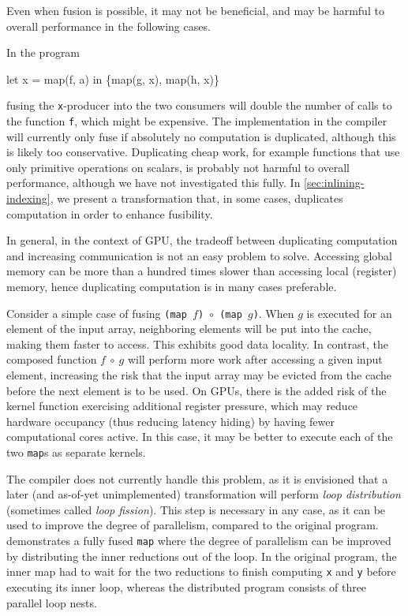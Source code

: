 Even when fusion is possible, it may not be beneficial, and may be
harmful to overall performance in the following cases.

\begin{description}[style=nextline]
\item[Computation may be duplicated.]

In the program
\begin{colorcode}
let x = map(f, a) in
\{map(g, x), map(h, x)\}
\end{colorcode}
fusing the \texttt{x}-producer into the two consumers will double the
number of calls to the function \texttt{f}, which might be expensive.
The implementation in the \LO{} compiler will currently only fuse if
absolutely no computation is duplicated, although this is likely too
conservative.  Duplicating cheap work, for example functions that use
only primitive operations on scalars, is probably not harmful to
overall performance, although we have not investigated this fully.  In
\cref{sec:inlining-indexing}, we present a transformation that, in
some cases, duplicates computation in order to enhance fusibility.

In general, in the context of GPU, the tradeoff between duplicating
computation and increasing communication is not an easy problem to
solve.  Accessing global memory can be more than a hundred times
slower than accessing local (register) memory, hence duplicating
computation is in many cases preferable.

\item[Can reduce memory locality.]

  Consider a simple case of fusing
  \texttt{(map~$f$)~$\circ$~(map~$g$)}.  When $g$ is executed for an
  element of the input array, neighboring elements will be put into
  the cache, making them faster to access.  This exhibits good data
  locality.  In contrast, the composed function $f~\circ~g$ will
  perform more work after accessing a given input element, increasing
  the risk that the input array may be evicted from the cache before
  the next element is to be used.  On GPUs, there is the added risk of
  the kernel function exercising additional register pressure, which
  may reduce hardware occupancy (thus reducing latency hiding) by
  having fewer computational cores active.  In this case, it may be
  better to execute each of the two \texttt{map}s as separate kernels.

  The \LO{} compiler does not currently handle this problem, as it is
  envisioned that a later (and as-of-yet unimplemented) transformation
  will perform \textit{loop distribution} (sometimes called
  \textit{loop fission}).  This step is necessary in any case, as it
  can be used to improve the degree of parallelism, compared to the
  original program.   demonstrates a fully
  fused \texttt{map} where the degree of parallelism can be improved
  by distributing the inner reductions out of the loop.  In the
  original program, the inner map had to wait for the two reductions
  to finish computing \texttt{x} and \texttt{y} before executing its
  inner loop, whereas the distributed program consists of three
  parallel loop nests.
\end{description}

